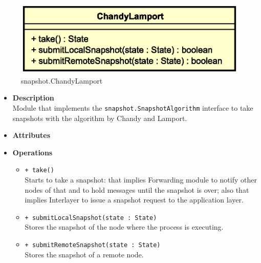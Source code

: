 
\begin{figure}[H]
  \centering
  \includegraphics[width=.5\columnwidth]{images/solution/mw/sn/sncl.eps}
  \caption{snapshot.ChandyLamport}
  \label{fig:mw-snapshot-chandylamport}
\end{figure}

\FloatBarrier
\begin{itemize}
  \item \textbf{Description} \\
    Module that implements the \texttt{snapshot.SnapshotAlgorithm}
    interface to take snapshots with the algorithm by Chandy and Lamport.
  \item \textbf{Attributes}
  \item \textbf{Operations}
  \begin{itemize}
    \item \texttt{+ take()} \\
    Starts to take a snapshot: that implies Forwarding module to notify
    other nodes of that and to hold messages until the snapshot is over; also
    that implies Interlayer to issue a snapshot request to the application
    layer.
    \item \texttt{+ submitLocalSnapshot(state : State)} \\
    Stores the snapshot of the node where the process is executing.
    \item \texttt{+ submitRemoteSnapshot(state : State)} \\
    Stores the snapshot of a remote node.
  \end{itemize}
\end{itemize}
